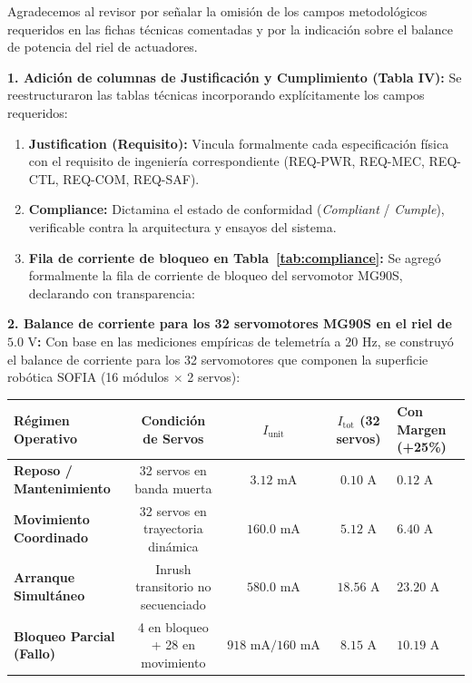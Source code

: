 \documentclass{LabDSTresponse}
\begin{document}
{Agradecemos al revisor por señalar la omisión de los campos metodológicos requeridos en las fichas técnicas comentadas y por la indicación sobre el balance de potencia del riel de actuadores.

\textbf{1. Adición de columnas de Justificación y Cumplimiento (Tabla IV):}
Se reestructuraron las tablas técnicas incorporando explícitamente los campos requeridos:
\begin{enumerate}
    \item \textbf{Justification (Requisito):} Vincula formalmente cada especificación física con el requisito de ingeniería correspondiente (REQ-PWR, REQ-MEC, REQ-CTL, REQ-COM, REQ-SAF).
    \item \textbf{Compliance:} Dictamina el estado de conformidad (\textit{Compliant} / \textit{Cumple}), verificable contra la arquitectura y ensayos del sistema.
    \item \textbf{Fila de corriente de bloqueo en Tabla~\ref{tab:compliance}:} Se agregó formalmente la fila de corriente de bloqueo del servomotor MG90S, declarando con transparencia:
\end{enumerate}

\textbf{2. Balance de corriente para los 32 servomotores MG90S en el riel de $5.0\text{ V}$:}
Con base en las mediciones empíricas de telemetría a $20\text{ Hz}$, se construyó el balance de corriente para los 32 servomotores que componen la superficie robótica SOFIA (16 módulos $\times$ 2 servos):

\begin{center}
\small
\begin{tabular}{p{3.2cm} c c c p{2.8cm}}
\toprule
\textbf{Régimen Operativo} & \textbf{Condición de Servos} & $I_{\text{unit}}$ & $I_{\text{tot}}$ (32 servos) & \textbf{Con Margen (+25\%)} \\
\midrule
\textbf{Reposo / Mantenimiento} & 32 servos en banda muerta & $3.12\text{ mA}$ & $0.10\text{ A}$ & $0.12\text{ A}$ \\
\textbf{Movimiento Coordinado} & 32 servos en trayectoria dinámica & $160.0\text{ mA}$ & $5.12\text{ A}$ & $6.40\text{ A}$ \\
\textbf{Arranque Simultáneo} & Inrush transitorio no secuenciado & $580.0\text{ mA}$ & $18.56\text{ A}$ & $23.20\text{ A}$ \\
\textbf{Bloqueo Parcial (Fallo)} & 4 en bloqueo + 28 en movimiento & $918\text{ mA} / 160\text{ mA}$ & $8.15\text{ A}$ & $10.19\text{ A}$ \\
\bottomrule
\end{tabular}
\end{center}

}
\end{document}
